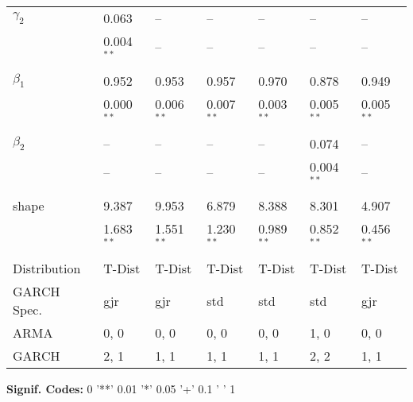 \begin{table}
\begin{threeparttable}
\begin{tabular}{l l l l | l l l}
			 $\gamma_{2}$  &  0.063           &    --        &    --        &    --        &    --        &    --        \\
						   &  0.004$^{**}$    &    --        &    --        &    --        &    --        &    --        \\ \\
			 $\beta_{1}$   &  0.952           & 0.953        & 0.957        & 0.970        & 0.878        & 0.949        \\
						   &  0.000$^{**}$    & 0.006$^{**}$ & 0.007$^{**}$ & 0.003$^{**}$ & 0.005$^{**}$ & 0.005$^{**}$ \\ \\
			 $\beta_{2}$   &     --           &    --        &    --        &    --        & 0.074        &    --        \\
						   &     --           &    --        &    --        &    --        & 0.004$^{**}$ &    --        \\ \\
			 shape         &  9.387           & 9.953        & 6.879        & 8.388        & 8.301        & 4.907        \\
						   &  1.683$^{**}$    & 1.551$^{**}$ & 1.230$^{**}$ & 0.989$^{**}$ & 0.852$^{**}$ & 0.456$^{**}$ \\ \\
			 Distribution  & T-Dist           & T-Dist       & T-Dist       & T-Dist       & T-Dist       & T-Dist       \\
			 GARCH Spec.   & gjr              &   gjr        &    std       &    std       &    std       &  gjr         \\
			 ARMA          &  0, 0            &  0, 0        &   0, 0       &   0, 0       &   1, 0       &  0, 0        \\
			 GARCH         &  2, 1            &  1, 1        &   1, 1       &   1, 1       &   2, 2       &  1, 1        \\
			\midrule
		\end{tabular}
		\begin{tablenotes}
			\item{\footnotesize \textbf{Signif. Codes:} 0 '**' 0.01 '*' 0.05 '+' 0.1 ' ' 1}
		\end{tablenotes}
	\end{threeparttable}
\end{table}


